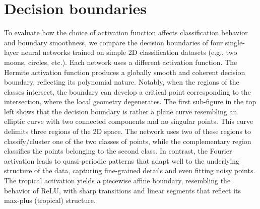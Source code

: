 \documentclass{article} %
\theoremstyle{plain}
\theoremstyle{definition}
\theoremstyle{remark}
\begin{document}
\section{Decision boundaries}
\label{appendix:noisy_boundaries}
To evaluate how the choice of activation function affects classification behavior and boundary smoothness, we compare the decision boundaries of four single-layer neural networks trained on simple 2D classification datasets (e.g., two moons, circles, etc.). Each network uses a different activation function. The Hermite activation function produces a globally smooth and coherent decision boundary, reflecting its polynomial nature. Notably, when the regions of the classes intersect, the boundary can develop a critical point corresponding to the intersection, where the local geometry degenerates. The first sub-figure in the top left shows that the decision boundary is rather a plane curve resembling an elliptic curve with two connected components and no singular points. This curve delimits three regions of the 2D space. The network uses two of these regions to classify/cluster one of the two classes of points, while the complementary region classifies the points belonging to the second class. In contrast, the Fourier activation leads to quasi-periodic patterns that adapt well to the underlying structure of the data, capturing fine-grained details and even fitting noisy points. The tropical activation yields a piecewise affine boundary, resembling the behavior of ReLU, with sharp transitions and linear segments that reflect its max-plus (tropical) structure.
\end{document}
